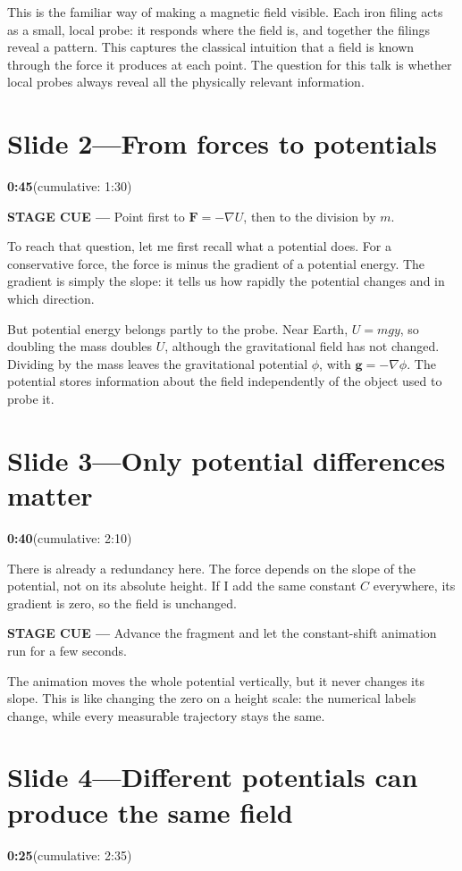 \documentclass[a4paper,11pt]{article}
\newcommand{\slidetime}[2]{%
  {\small\sffamily\color{timegreen}\textbf{#1}\enspace(cumulative: #2)}%
}
\newcommand{\cue}[1]{%
  \par\smallskip
  \noindent
  {\small\sffamily\color{cueblue}\textbf{STAGE CUE ---} #1}
  \par\smallskip
}
\newenvironment{spoken}{%
  \begin{list}{}{%
    \setlength{\leftmargin}{1.1em}%
    \setlength{\rightmargin}{1.1em}%
    \setlength{\topsep}{2pt}%
    \setlength{\partopsep}{0pt}%
    \setlength{\parsep}{5pt}%
    \setlength{\itemsep}{0pt}}%
  \item\relax
}{\end{list}}
\newcommand{\slideheading}[4]{%
  \needspace{10\baselineskip}
  \section*{#1\enspace---\enspace#2}
  \vspace{-0.7em}
  \noindent\slidetime{#3}{#4}\par\smallskip
}
\begin{document}
\begin{spoken}
This is the familiar way of making a magnetic field visible. Each iron filing
acts as a small, local probe: it responds where the field is, and together the
filings reveal a pattern. This captures the classical intuition that a field
is known through the force it produces at each point. The question for this
talk is whether local probes always reveal all the physically relevant
information.
\end{spoken}


\slideheading{Slide 2}{From forces to potentials}{0:45}{1:30}

\cue{Point first to \(\mathbf F=-\nabla U\), then to the division by \(m\).}

\begin{spoken}
To reach that question, let me first recall what a potential does. For a
conservative force, the force is minus the gradient of a potential energy.
The gradient is simply the slope: it tells us how rapidly the potential
changes and in which direction.

But potential energy belongs partly to the probe. Near Earth,
\(U=mgy\), so doubling the mass doubles \(U\), although the gravitational
field has not changed. Dividing by the mass leaves the gravitational
potential \(\phi\), with \(\mathbf g=-\nabla\phi\). The potential stores
information about the field independently of the object used to probe it.
\end{spoken}


\slideheading{Slide 3}{Only potential differences matter}{0:40}{2:10}

\begin{spoken}
There is already a redundancy here. The force depends on the slope of the
potential, not on its absolute height. If I add the same constant \(C\)
everywhere, its gradient is zero, so the field is unchanged.
\end{spoken}

\cue{Advance the fragment and let the constant-shift animation run for a few seconds.}

\begin{spoken}
The animation moves the whole potential vertically, but it never changes its
slope. This is like changing the zero on a height scale: the numerical labels
change, while every measurable trajectory stays the same.
\end{spoken}


\slideheading{Slide 4}{Different potentials can produce the same field}{0:25}{2:35}
\end{document}
